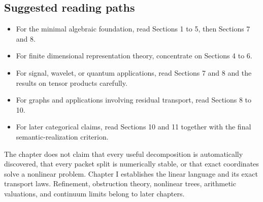 \subsection*{Suggested reading paths}
\begin{itemize}
\item For the minimal algebraic foundation, read Sections 1 to 5, then Sections 7 and 8.
\item For finite dimensional representation theory, concentrate on Sections 4 to 6.
\item For signal, wavelet, or quantum applications, read Sections 7 and 8 and the results on tensor products carefully.
\item For graphs and applications involving residual transport, read Sections 8 to 10.
\item For later categorical claims, read Sections 10 and 11 together with the final semantic-realization criterion.
\end{itemize}

\begin{warningbox}
The chapter does not claim that every useful decomposition is automatically discovered, that every packet split is numerically stable, or that exact coordinates solve a nonlinear problem.  Chapter I establishes the linear language and its exact transport laws.  Refinement, obstruction theory, nonlinear trees, arithmetic valuations, and continuum limits belong to later chapters.
\end{warningbox}

